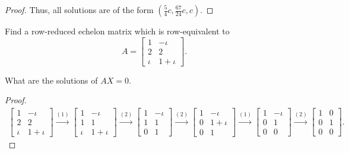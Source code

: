 \begin{proof}
    Thus, all solutions are of the form $(\frac{5}{4}c, \frac{67}{24}c, c)$.
\end{proof}

\begin{exercise}
    Find a row-reduced echelon matrix which is row-equivalent to
    \[
        A =
        \begin{bmatrix}
            1     & -\iota    \\
            2     & 2         \\
            \iota & 1 + \iota
        \end{bmatrix}.
    \]

    What are the solutions of $AX = 0$.
\end{exercise}

\begin{proof}
    \begingroup{}
    \allowdisplaybreaks{}
    \begin{align*}
        \begin{bmatrix}
            1       & -\iota{}    \\
            2       & 2           \\
            \iota{} & 1 + \iota{}
        \end{bmatrix}
        \stackrel{(1)}{\rightarrow}
        \begin{bmatrix}
            1       & -{\iota}    \\
            1       & 1           \\
            {\iota} & 1 + {\iota}
        \end{bmatrix}
        \stackrel{(2)}{\rightarrow}
        \begin{bmatrix}
            1 & -{\iota} \\
            1 & 1        \\
            0 & 1
        \end{bmatrix}
        \stackrel{(2)}{\rightarrow}
        \begin{bmatrix}
            1 & -{\iota}    \\
            0 & 1 + {\iota} \\
            0 & 1
        \end{bmatrix}
        \stackrel{(1)}{\rightarrow}
        \begin{bmatrix}
            1 & -{\iota} \\
            0 & 1        \\
            0 & 0
        \end{bmatrix}
        \stackrel{(2)}{\rightarrow}
        \begin{bmatrix}
            1 & 0 \\
            0 & 1 \\
            0 & 0
        \end{bmatrix}.
    \end{align*}
    \endgroup{}


\end{proof}
